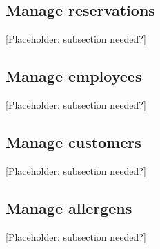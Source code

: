 \documentclass{article}
\begin{document}
\subsection*{Manage reservations}
[Placeholder: subsection needed?]

\subsection*{Manage employees}
[Placeholder: subsection needed?]

\subsection*{Manage customers}
[Placeholder: subsection needed?]

\subsection*{Manage allergens}
[Placeholder: subsection needed?]

\clearpage
\end{document}
